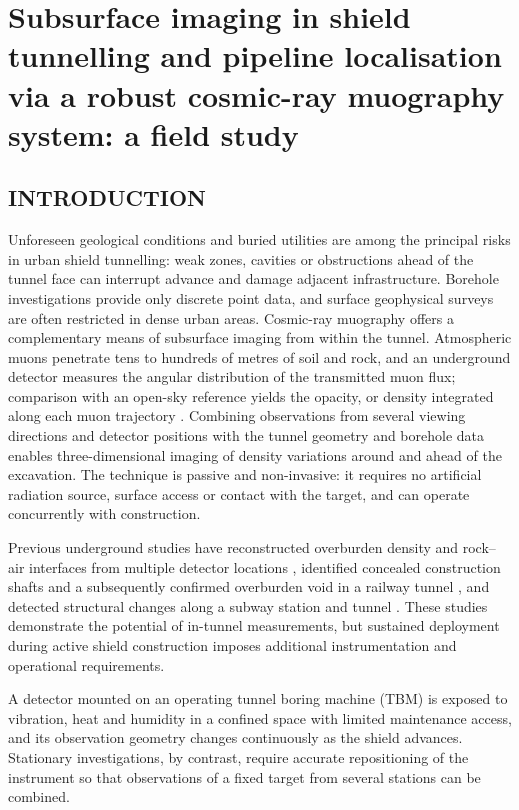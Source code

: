 \documentclass{WTC2027}
\begin{document}

\chapter{Subsurface imaging in shield tunnelling and pipeline localisation via a robust cosmic-ray muography system: a field study}

\section{INTRODUCTION}
Unforeseen geological conditions and buried utilities are among the principal risks in urban shield tunnelling: weak zones, cavities or obstructions ahead of the tunnel face can interrupt advance and damage adjacent infrastructure. Borehole investigations provide only discrete point data, and surface geophysical surveys are often restricted in dense urban areas. Cosmic-ray muography offers a complementary means of subsurface imaging from within the tunnel. Atmospheric muons penetrate tens to hundreds of metres of soil and rock, and an underground detector measures the angular distribution of the transmitted muon flux; comparison with an open-sky reference yields the opacity, or density integrated along each muon trajectory \autocite{procureur2018}. Combining observations from several viewing directions and detector positions with the tunnel geometry and borehole data enables three-dimensional imaging of density variations around and ahead of the excavation. The technique is passive and non-invasive: it requires no artificial radiation source, surface access or contact with the target, and can operate concurrently with construction.

Previous underground studies have reconstructed overburden density and rock--air interfaces from multiple detector locations \autocite{guardincerri2017}, identified concealed construction shafts and a subsequently confirmed overburden void in a railway tunnel \autocite{thompson2020}, and detected structural changes along a subway station and tunnel \autocite{mao2023}. These studies demonstrate the potential of in-tunnel measurements, but sustained deployment during active shield construction imposes additional instrumentation and operational requirements.

A detector mounted on an operating tunnel boring machine (TBM) is exposed to vibration, heat and humidity in a confined space with limited maintenance access, and its observation geometry changes continuously as the shield advances. Stationary investigations, by contrast, require accurate repositioning of the instrument so that observations of a fixed target from several stations can be combined.
\end{document}
